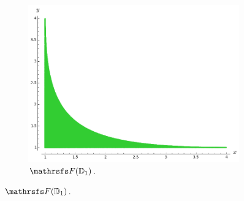 \documentclass{beamer}
\begin{document}
\begin{frame}
\begin{figure}
\begin{subfigure}{.32\linewidth}
\includegraphics[width=1\textwidth]{plots/ch5_39_disc3.png}
\caption{$\FFF({\mathbb D}_1)$.}
\end{subfigure}
\end{figure}
\end{frame}
\end{document}
